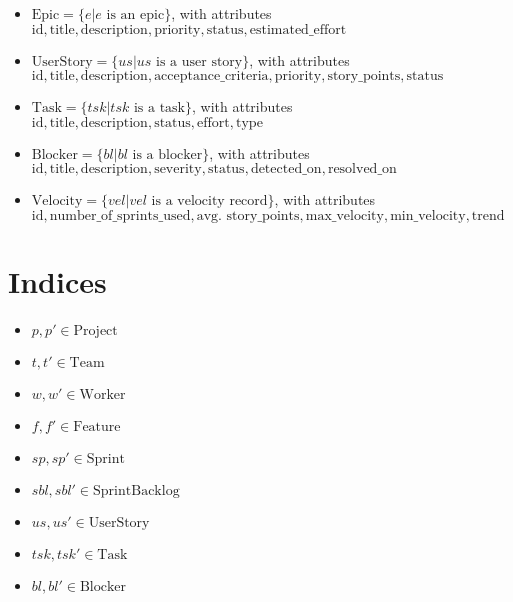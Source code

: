 \documentclass[11pt]{article}
\begin{document}
\begin{itemize}
    \item $\text{Epic} = \{e | e \text{ is an epic}\}$, with attributes $\text{id}, \text{title}, \text{description}, \text{priority}, \text{status}, \text{estimated\_effort}$
    \item $\text{UserStory} = \{us | us \text{ is a user story}\}$, with attributes $\text{id}, \text{title}, \text{description}, \text{acceptance\_criteria}, \text{priority}, \text{story\_points}, \text{status}$
    \item $\text{Task} = \{tsk | tsk \text{ is a task}\}$, with attributes $\text{id}, \text{title}, \text{description}, \text{status}, \text{effort}, \text{type}$
    \item $\text{Blocker} = \{bl | bl \text{ is a blocker}\}$, with attributes $\text{id}, \text{title}, \text{description}, \text{severity}, \text{status}, \text{detected\_on}, \text{resolved\_on}$
    \item $\text{Velocity} = \{vel | vel \text{ is a velocity record}\}$, with attributes $\text{id}, \text{number\_of\_sprints\_used}, \text{avg. story\_points}, \text{max\_velocity}, \text{min\_velocity}, \text{trend}$
\end{itemize}

\section{Indices}
\begin{itemize}
    \item $p, p' \in \text{Project}$
    \item $t, t' \in \text{Team}$
    \item $w, w' \in \text{Worker}$
    \item $f, f' \in \text{Feature}$
    \item $sp, sp' \in \text{Sprint}$
    \item $sbl, sbl' \in \text{SprintBacklog}$
    \item $us, us' \in \text{UserStory}$
    \item $tsk, tsk' \in \text{Task}$
    \item $bl, bl' \in \text{Blocker}$
\end{itemize}
\end{document}
